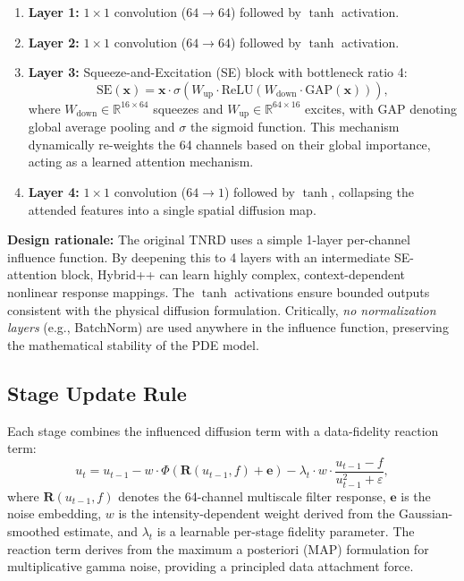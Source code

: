 \documentclass[conference]{IEEEtran}
\begin{document}
\begin{enumerate}
\item \textbf{Layer 1:} $1{\times}1$ convolution ($64 \to 64$) followed by $\tanh$ activation.
\item \textbf{Layer 2:} $1{\times}1$ convolution ($64 \to 64$) followed by $\tanh$ activation.
\item \textbf{Layer 3:} Squeeze-and-Excitation (SE) block with bottleneck ratio 4:
\begin{equation}
\text{SE}(\mathbf{x}) = \mathbf{x} \cdot \sigma\!\left(W_{\text{up}} \cdot \text{ReLU}(W_{\text{down}} \cdot \text{GAP}(\mathbf{x}))\right),
\end{equation}
where $W_{\text{down}} \in \mathbb{R}^{16\times64}$ squeezes and $W_{\text{up}} \in \mathbb{R}^{64\times16}$ excites, with $\text{GAP}$ denoting global average pooling and $\sigma$ the sigmoid function. This mechanism dynamically re-weights the 64 channels based on their global importance, acting as a learned attention mechanism.
\item \textbf{Layer 4:} $1{\times}1$ convolution ($64 \to 1$) followed by $\tanh$, collapsing the attended features into a single spatial diffusion map.
\end{enumerate}

\textbf{Design rationale:} The original TNRD uses a simple 1-layer per-channel influence function. By deepening this to 4 layers with an intermediate SE-attention block, Hybrid++ can learn highly complex, context-dependent nonlinear response mappings. The $\tanh$ activations ensure bounded outputs consistent with the physical diffusion formulation. Critically, \textit{no normalization layers} (e.g., BatchNorm) are used anywhere in the influence function, preserving the mathematical stability of the PDE model.

\subsection{Stage Update Rule}
Each stage combines the influenced diffusion term with a data-fidelity reaction term:
\begin{equation}
u_t = u_{t-1} - w \cdot \Phi\!\left(\mathbf{R}(u_{t-1}, f) + \mathbf{e}\right) - \lambda_t \cdot w \cdot \frac{u_{t-1} - f}{u_{t-1}^2 + \varepsilon},
\end{equation}
where $\mathbf{R}(u_{t-1}, f)$ denotes the 64-channel multiscale filter response, $\mathbf{e}$ is the noise embedding, $w$ is the intensity-dependent weight derived from the Gaussian-smoothed estimate, and $\lambda_t$ is a learnable per-stage fidelity parameter. The reaction term derives from the maximum a posteriori (MAP) formulation for multiplicative gamma noise, providing a principled data attachment force.
\end{document}
